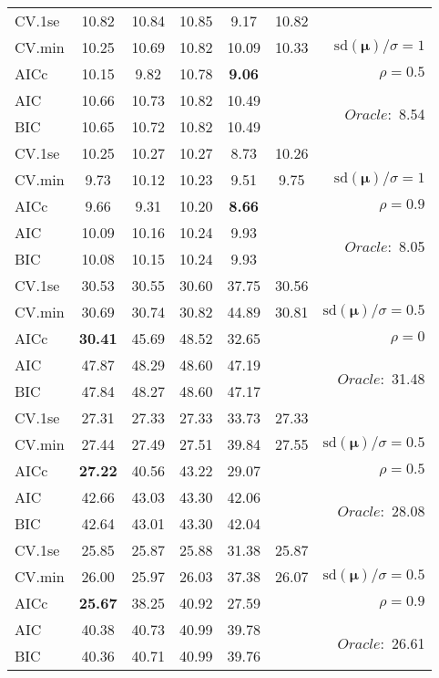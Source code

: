 \begin{table}
\begin{center}
\begin{tabular}{l*{5}{c}|r}
 \hline 
CV.1se & 10.82 & 10.84 & 10.85 & 9.17 & 10.82 & \\
CV.min & 10.25 & 10.69 & 10.82 & 10.09 & 10.33 &  $\mathrm{sd}(\mathbf{\mu})/\sigma=1$ \\
AICc & 10.15 & 9.82 & 10.78 & {\bf 9.06} & & $\rho=0.5$ \\
AIC & 10.66 & 10.73 & 10.82 & 10.49 & &  \multirow{2}{*}{$Oracle: $ 8.54} \\
BIC & 10.65 & 10.72 & 10.82 & 10.49 & &  \\
 \hline 
CV.1se & 10.25 & 10.27 & 10.27 & 8.73 & 10.26 & \\
CV.min & 9.73 & 10.12 & 10.23 & 9.51 & 9.75 &  $\mathrm{sd}(\mathbf{\mu})/\sigma=1$ \\
AICc & 9.66 & 9.31 & 10.20 & {\bf 8.66} & & $\rho=0.9$ \\
AIC & 10.09 & 10.16 & 10.24 & 9.93 & &  \multirow{2}{*}{$Oracle: $ 8.05} \\
BIC & 10.08 & 10.15 & 10.24 & 9.93 & &  \\
 \hline 
CV.1se & 30.53 & 30.55 & 30.60 & 37.75 & 30.56 & \\
CV.min & 30.69 & 30.74 & 30.82 & 44.89 & 30.81 &  $\mathrm{sd}(\mathbf{\mu})/\sigma=0.5$ \\
AICc & {\bf 30.41} & 45.69 & 48.52 & 32.65 & & $\rho=0$ \\
AIC & 47.87 & 48.29 & 48.60 & 47.19 & &  \multirow{2}{*}{$Oracle: $ 31.48} \\
BIC & 47.84 & 48.27 & 48.60 & 47.17 & &  \\
 \hline 
CV.1se & 27.31 & 27.33 & 27.33 & 33.73 & 27.33 & \\
CV.min & 27.44 & 27.49 & 27.51 & 39.84 & 27.55 &  $\mathrm{sd}(\mathbf{\mu})/\sigma=0.5$ \\
AICc & {\bf 27.22} & 40.56 & 43.22 & 29.07 & & $\rho=0.5$ \\
AIC & 42.66 & 43.03 & 43.30 & 42.06 & &  \multirow{2}{*}{$Oracle: $ 28.08} \\
BIC & 42.64 & 43.01 & 43.30 & 42.04 & &  \\
 \hline 
CV.1se & 25.85 & 25.87 & 25.88 & 31.38 & 25.87 & \\
CV.min & 26.00 & 25.97 & 26.03 & 37.38 & 26.07 &  $\mathrm{sd}(\mathbf{\mu})/\sigma=0.5$ \\
AICc & {\bf 25.67} & 38.25 & 40.92 & 27.59 & & $\rho=0.9$ \\
AIC & 40.38 & 40.73 & 40.99 & 39.78 & &  \multirow{2}{*}{$Oracle: $ 26.61} \\
BIC & 40.36 & 40.71 & 40.99 & 39.76 & &  \\
 \hline 
\end{tabular}
\end{center}
\vspace{-1cm}
\end{table}





